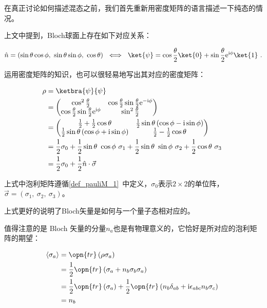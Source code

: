 在真正讨论如何描述混态之前，我们首先重新用密度矩阵的语言描述一下纯态的情况。

上文中提到，Bloch球面上存在如下对应关系：

\begin{equation}
\hat{n} = \left(  \sin \theta \cos \phi ,~ \sin\theta \sin\phi ,~ \cos\theta  \right) ~\iff~\ket{\psi} = \cos\frac{\theta}{2}\ket{0} + \sin\frac{\theta}{2}\mathrm{e}^{\mathrm{i}\phi}\ket{1}~.
\end{equation}

运用密度矩阵的知识，也可以很轻易地写出其对应的密度矩阵：

\begin{equation}
\begin{aligned}
\rho &= \ketbra{\psi}{\psi} \\
&=  \begin{pmatrix}
    \cos^2\frac{\theta}{2} & \cos\frac{\theta}{2} \sin\frac{\theta}{2}\mathrm{e}^{-\mathrm{i}\phi} \\
    \cos\frac{\theta}{2} \sin\frac{\theta}{2}\mathrm{e}^{\mathrm{i}\phi} & \sin^2\frac{\theta}{2} \\
    \end{pmatrix} \\
&=  \begin{pmatrix}
    \frac{1}{2} + \frac{1}{2}\cos\theta & \frac{1}{2}\sin\theta\left( \cos\phi - \mathrm{i}\sin\phi \right)\\
    \frac{1}{2}\sin\theta\left( \cos\phi + \mathrm{i}\sin\phi \right) & \frac{1}{2} - \frac{1}{2}\cos \theta \\
    \end{pmatrix} \\
&= \frac{1}{2}\sigma_0 + \frac{1}{2}\sin\theta ~\cos\phi~\sigma_1 + \frac{1}{2}\sin\theta ~\sin\phi~\sigma_2 + \frac{1}{2}\cos\theta~\sigma_3 \\
&= \frac{1}{2} \sigma_0 + \frac{1}{2}\hat{n}\cdot \vec{\sigma}
\end{aligned}~
\end{equation}

上式中泡利矩阵遵循\autoref{def_pauliM_1}~中定义，$\sigma_0$表示$2\times 2$的单位阵，$\vec{\sigma} = \left( \sigma_1 ,~\sigma_2,~\sigma_3 \right)$。

上式更好的说明了Bloch矢量是如何与一个量子态相对应的。

值得注意的是 Bloch 矢量的分量$n_a$也是有物理意义的，它恰好是所对应的泡利矩阵的期望：

\begin{equation}\label{eq_Qubit_1}
\begin{aligned}
\left\langle \sigma_a \right\rangle &= \opn{tr}\left( \rho\sigma_a \right) \\
&= \frac{1}{2}\opn{tr}\left( \sigma_a + n_b \sigma_b\sigma_a \right) \\
&= \frac{1}{2}\opn{tr}\left(\sigma_a\right) + \frac{1}{2}\opn{tr}\left( n_b\delta_{ab} + \mathrm{i}\epsilon_{abc}n_b\sigma_c\right) \\
&= n_b
\end{aligned}~
\end{equation}

